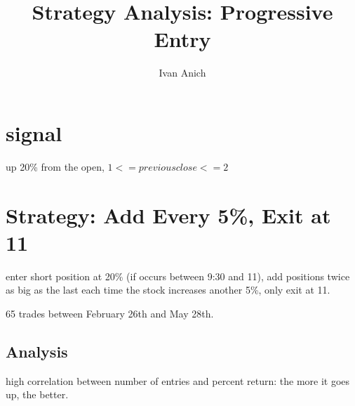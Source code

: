\documentclass{article}
\title{Strategy Analysis: Progressive Entry}
\author{Ivan Anich}
\begin{document}
\maketitle

\section{signal}

up 20\% from the open, \(1<= previous close <= 2\)

\section{Strategy: Add Every 5\%, Exit at 11}

enter short position at 20\% (if occurs between 9:30 and 11), add positions twice as big as the last each time the stock increases another 5\%, only exit at 11.

65 trades between February 26th and May 28th. 

\subsection{Analysis}

high correlation between number of entries and percent return: the more it goes up, the better.
\end{document}
